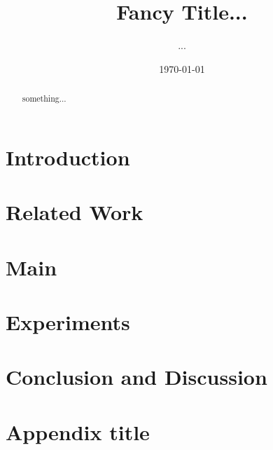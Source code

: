 \documentclass{article}
\begin{document}
\title{Fancy Title...}

\author{%
	...
}

\date{\today}                       
\maketitle

\begin{abstract}
something...
\end{abstract}


\section{Introduction}\label{sec:introduction}

\section{Related Work}\label{sec:related_work}

\section{Main}\label{sec:main}

\section{Experiments}\label{sec:experiments}

\section{Conclusion and Discussion}\label{s:ccl}

 

\newpage
\appendix
\section{Appendix title}\label{a:appendix1}
\end{document}
